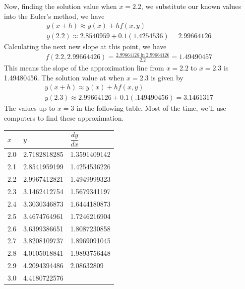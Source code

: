 \documentclass[11pt]{report}
\newcommand{\sps}{\\[0.2cm]}
\newcommand{\NI}{\noindent}
\begin{document}
	\NI Now, finding the solution value when $x=2.2$, we substitute our known values into the Euler's method, we have
	\begin{eqnarray*}
		y(x+h)\approx y(x) + hf(x,y)\sps
		y(2.2) \approx 2.8540959 + 0.1(1.4254536) = 2.99664126
	\end{eqnarray*}
	Calculating the next new slope at this point, we have
	\begin{eqnarray*}
		f(2.2, 2.99664426) = \frac{2.99664126\ln 2.99664126}{2.2} = 1.49490457
	\end{eqnarray*}
	This means the slope of the approximation line from $x=2.2$ to $x=2.3$ is 1.49480456. The solution value at when $x=2.3$ is given by
	\begin{eqnarray*}
		y(x+h) \approx y(x) + hf(x,y)\sps
		y(2.3) \approx 2.99664126 + 0.1(.149490456) = 3.1461317
	\end{eqnarray*}
	The values up to $x=3$ in the following table. Most of the time, we'll use computers to find these approximation.
	\begin{longtable}{|m{2cm}|m{4cm}|m{4cm}|}
			\hline
			$x$ & $y$ & $\dfrac{dy}{dx}$\\\hline
			2.0 & 2.7182818285 & 1.3591409142\\\hline
			2.1 & 2.8541959199 & 1.4254536226\\\hline
			2.2 & 2.9967412821 & 1.4949999323\\\hline
			2.3 & 3.1462412754 & 1.5679341197\\\hline
			2.4 & 3.3030346873 & 1.6444180873\\\hline
			2.5 & 3.4674764961 & 1.7246216904\\\hline
			2.6 & 3.6399386651 & 1.8087230858\\\hline
			2.7 & 3.8208109737 & 1.8969091045\\\hline
			2.8 & 4.0105018841 & 1.9893756448\\\hline
			2.9 & 4.2094394486 & 2.08632809\\\hline
			3.0 & 4.4180722576 &\\\hline
	\end{longtable}

	
\end{document}
